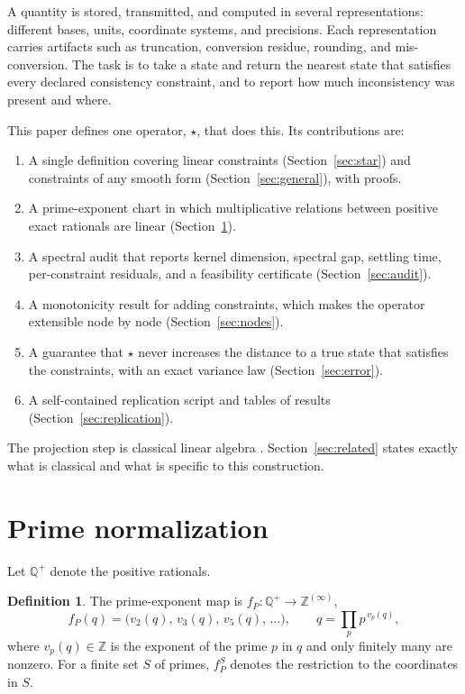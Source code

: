 \documentclass[11pt,letterpaper]{article}
\theoremstyle{plain}
\theoremstyle{definition}
\newtheorem{definition}{Definition}
\theoremstyle{remark}
\newcommand{\Q}{\mathbb{Q}}
\newcommand{\Z}{\mathbb{Z}}
\newcommand{\fP}{f_{P}}
\begin{document}
A quantity is stored, transmitted, and computed in several representations: different bases, units, coordinate systems, and precisions. Each representation carries artifacts such as truncation, conversion residue, rounding, and mis-conversion. The task is to take a state and return the nearest state that satisfies every declared consistency constraint, and to report how much inconsistency was present and where.

This paper defines one operator, $\star$, that does this. Its contributions are:
\begin{enumerate}
\item A single definition covering linear constraints (Section~\ref{sec:star}) and constraints of any smooth form (Section~\ref{sec:general}), with proofs.
\item A prime-exponent chart in which multiplicative relations between positive exact rationals are linear (Section~\ref{sec:prime}).
\item A spectral audit that reports kernel dimension, spectral gap, settling time, per-constraint residuals, and a feasibility certificate (Section~\ref{sec:audit}).
\item A monotonicity result for adding constraints, which makes the operator extensible node by node (Section~\ref{sec:nodes}).
\item A guarantee that $\star$ never increases the distance to a true state that satisfies the constraints, with an exact variance law (Section~\ref{sec:error}).
\item A self-contained replication script and tables of results (Section~\ref{sec:replication}).
\end{enumerate}
The projection step is classical linear algebra \cite{penrose,benisrael}. Section~\ref{sec:related} states exactly what is classical and what is specific to this construction.

\section{Prime normalization}\label{sec:prime}

Let $\Q^{+}$ denote the positive rationals.

\begin{definition}
The prime-exponent map is $\fP:\Q^{+}\to\Z^{(\infty)}$,
\[
\fP(q)=\bigl(v_{2}(q),\,v_{3}(q),\,v_{5}(q),\,\dots\bigr),\qquad q=\prod_{p}p^{\,v_{p}(q)},
\]
where $v_{p}(q)\in\Z$ is the exponent of the prime $p$ in $q$ and only finitely many are nonzero. For a finite set $S$ of primes, $\fP^{S}$ denotes the restriction to the coordinates in $S$.
\end{definition}
\end{document}

